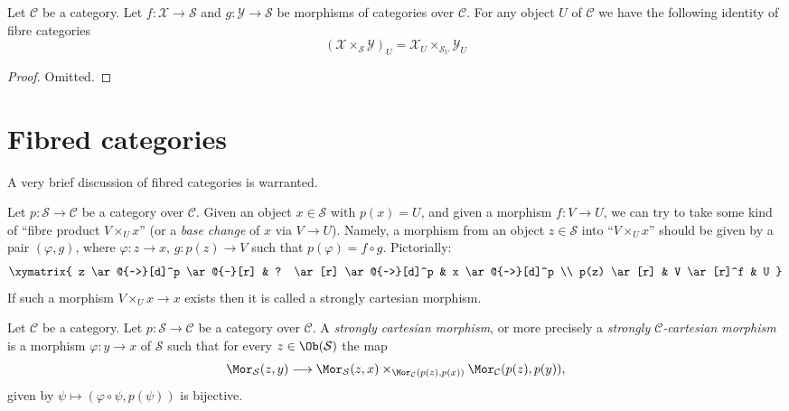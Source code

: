 \begin{lemma}
\label{lemma-fibre-2-fibre-product-categories-over-C}
Let $\mathcal{C}$ be a category.
Let $f : \mathcal{X} \to \mathcal{S}$ and
$g : \mathcal{Y} \to \mathcal{S}$ be morphisms of categories over
$\mathcal{C}$. For any object $U$ of $\mathcal{C}$ we have
the following identity of
fibre categories
$$
\left(\mathcal{X} \times_\mathcal{S}\mathcal{Y}\right)_U
=
\mathcal{X}_U \times_{\mathcal{S}_U} \mathcal{Y}_U
$$
\end{lemma}

\begin{proof}
Omitted.
\end{proof}







\section{Fibred categories}
\label{section-fibred-categories}

\noindent
A very brief discussion of fibred categories is warranted.

\medskip\noindent
Let $p : \mathcal{S} \to \mathcal{C}$ be a category over $\mathcal{C}$.
Given an object $x \in \mathcal{S}$ with $p(x) = U$, and given a morphism
$f : V \to U$, we can try to take some kind of ``fibre product
$V \times_U x$'' (or a {\it base change} of $x$ via $V \to U$).
Namely, a morphism from an object $z \in \mathcal{S}$
into ``$V \times_U x$'' should be given by a pair
$(\varphi, g)$, where
$\varphi : z \to x$, $g : p(z) \to V$ such that
$p(\varphi) = f \circ g$. Pictorially:
$$
\xymatrix{
z \ar@{~>}[d]^p \ar@{-}[r] &
? \ar[r] \ar@{~>}[d]^p &
x \ar@{~>}[d]^p \\
p(z) \ar[r] & V \ar[r]^f & U
}
$$
If such a morphism $V \times_U x \to x$ exists then it is called
a strongly cartesian morphism.

\begin{definition}
\label{definition-cartesian-over-C}
Let $\mathcal{C}$ be a category.
Let $p : \mathcal{S} \to \mathcal{C}$ be a category over $\mathcal{C}$.
A {\it strongly cartesian morphism}, or more precisely a
{\it strongly $\mathcal{C}$-cartesian morphism} is a
morphism $\varphi : y \to x$ of $\mathcal{S}$ such that
for every $z \in \Ob(\mathcal{S})$ the map
$$
\Mor_\mathcal{S}(z, y)
\longrightarrow
\Mor_\mathcal{S}(z, x)
\times_{\Mor_\mathcal{C}(p(z), p(x))}
\Mor_\mathcal{C}(p(z), p(y)),
$$
given by $\psi \longmapsto (\varphi \circ \psi, p(\psi))$
is bijective.
\end{definition}

